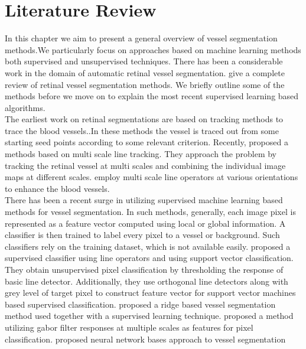 \section{Literature Review}
In this chapter we aim to present a general overview of vessel segmentation methods.We particularly focus on approaches based on machine learning methods both supervised and unsupervised techniques. There has been a considerable work in the domain of automatic retinal vessel segmentation. \citet{surveyretinal} give a complete review of retinal vessel segmentation methods. We briefly outline some of the methods before we move on to explain the most recent supervised learning based algorithms.\\

The earliest work on retinal segmentations are based on tracking methods to trace the blood vessels\cite{trackingchutatape1998retinal,trackingtolias1998fuzzy}..In these methods the vessel is traced out from some starting seed points according to some relevant criterion. Recently,\citet{vlachos2010multi} proposed a methods based on multi scale line tracking. They approach the problem by tracking the retinal vessel at multi scales and combining the individual image maps at different scales.\citet{farnell2008enhancement} employ multi scale line operators at various orientations to enhance the blood vessels.\\

There has been a recent surge in utilizing supervised machine learning based methods for vessel segmentation. In such methods, generally, each image pixel is represented as a feature vector computed using local or global information. A classifier is then trained to label every pixel to a vessel or background. Such classifiers rely on the training dataset, which is not available easily.\citet{ricci2007retinal} proposed a supervised classifier using line operators and using support vector classification. They obtain unsupervised pixel classification by thresholding the response of basic line detector. Additionally, they use orthogonal line detectors along with grey level of target pixel to construct feature vector for support vector machines based supervised classification.\citet{staal2004ridge} proposed a ridge based vessel segmentation method used together with a supervised learning technique.\citet{nguyen2011effective} proposed a method utilizing gabor filter responses at multiple scales as features for pixel classification.\cite{vega2013blood,gardner1996automatic} proposed neural network bases approach to vessel segmentation\\

